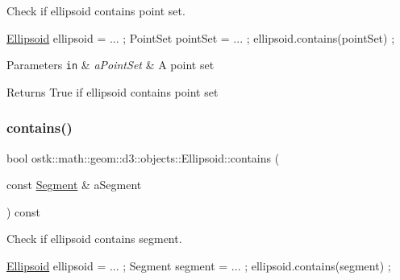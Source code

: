 Check if ellipsoid contains point set. 


\begin{DoxyCode}
\hyperlink{classostk_1_1math_1_1geom_1_1d3_1_1objects_1_1_ellipsoid_acd84276f65a14db12623402a411712b7}{Ellipsoid} ellipsoid = ... ;
PointSet pointSet = ... ;
ellipsoid.contains(pointSet) ;
\end{DoxyCode}



\begin{DoxyParams}[1]{Parameters}
\mbox{\tt in}  & {\em a\+Point\+Set} & A point set \\
\hline
\end{DoxyParams}
\begin{DoxyReturn}{Returns}
True if ellipsoid contains point set 
\end{DoxyReturn}
\mbox{\label{classostk_1_1math_1_1geom_1_1d3_1_1objects_1_1_ellipsoid_afcb41440d899c60766cdc7e9c838c55d}} 
\subsubsection{\texorpdfstring{contains()}{contains()}\hspace{0.1cm}{\footnotesize\ttfamily [3/3]}}
{\footnotesize\ttfamily bool ostk\+::math\+::geom\+::d3\+::objects\+::\+Ellipsoid\+::contains (\begin{DoxyParamCaption}\item[{const \hyperlink{classostk_1_1math_1_1geom_1_1d3_1_1objects_1_1_segment}{Segment} \&}]{a\+Segment }\end{DoxyParamCaption}) const}



Check if ellipsoid contains segment. 


\begin{DoxyCode}
\hyperlink{classostk_1_1math_1_1geom_1_1d3_1_1objects_1_1_ellipsoid_acd84276f65a14db12623402a411712b7}{Ellipsoid} ellipsoid = ... ;
Segment segment = ... ;
ellipsoid.contains(segment) ;
\end{DoxyCode}



